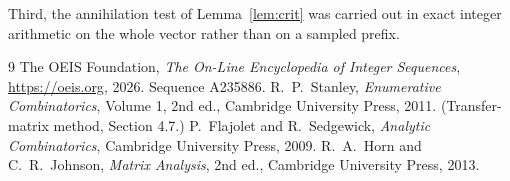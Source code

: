 \documentclass[11pt,a4paper]{article}
\theoremstyle{plain}
\theoremstyle{definition}
\begin{document}
Third, the annihilation test of Lemma~\ref{lem:crit} was carried out in exact integer
arithmetic on the whole vector rather than on a sampled prefix.

\begin{thebibliography}{9}
 The OEIS Foundation, \emph{The On-Line Encyclopedia of Integer
Sequences}, \url{https://oeis.org}, 2026. Sequence A235886.
 R.~P.~Stanley, \emph{Enumerative Combinatorics}, Volume 1, 2nd ed.,
Cambridge University Press, 2011. (Transfer-matrix method, Section 4.7.)
 P.~Flajolet and R.~Sedgewick, \emph{Analytic Combinatorics}, Cambridge
University Press, 2009.
 R.~A.~Horn and C.~R.~Johnson, \emph{Matrix Analysis}, 2nd ed., Cambridge
University Press, 2013.
\end{thebibliography}
\end{document}
